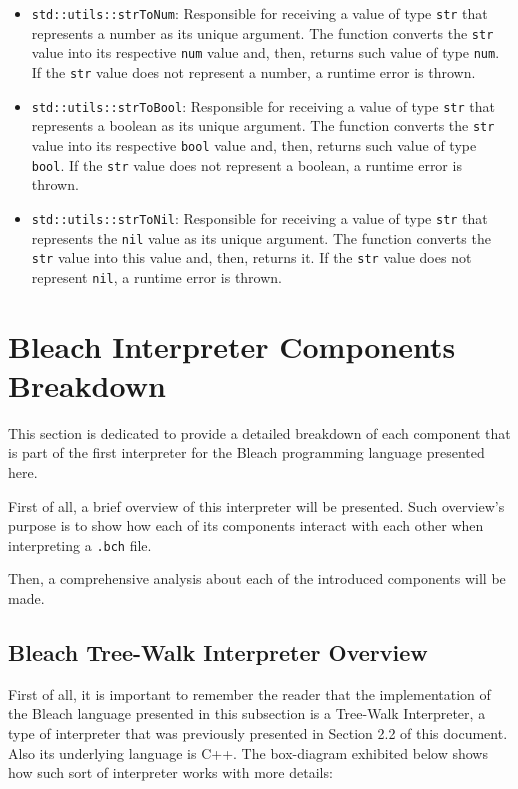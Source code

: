 \begin{itemize}
\begin{itemize}
            \item \texttt{std::utils::strToNum}: Responsible for receiving a value of type \texttt{str} that represents a number as its unique argument. The function converts the \texttt{str} value into its respective \texttt{num} value and, then, returns such value of type \texttt{num}. If the \texttt{str} value does not represent a number, a runtime error is thrown.

            \item \texttt{std::utils::strToBool}: Responsible for receiving a value of type \texttt{str} that represents a boolean as its unique argument. The function converts the \texttt{str} value into its respective \texttt{bool} value and, then, returns such value of type \texttt{bool}. If the \texttt{str} value does not represent a boolean, a runtime error is thrown.

            \item \texttt{std::utils::strToNil}: Responsible for receiving a value of type \texttt{str} that represents the \texttt{nil} value as its unique argument. The function converts the \texttt{str} value into this value and, then, returns it. If the \texttt{str} value does not represent \texttt{nil}, a runtime error is thrown.
        \end{itemize}
\end{itemize}

\section{Bleach Interpreter Components Breakdown}
This section is dedicated to provide a detailed breakdown of each component that is part of the first interpreter for the Bleach programming language presented here.

First of all, a brief overview of this interpreter will be presented. Such overview's purpose is to show how each of its components interact with each other when interpreting a \texttt{.bch} file.

Then, a comprehensive analysis about each of the introduced components will be made.

\subsection{Bleach Tree-Walk Interpreter Overview}
First of all, it is important to remember the reader that the implementation of the Bleach language presented in this subsection is a Tree-Walk Interpreter, a type of interpreter that was previously presented in Section 2.2 of this document. Also its underlying language is C++. The box-diagram exhibited below shows how such sort of interpreter works with more details:

